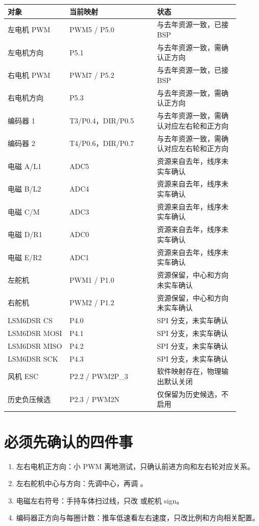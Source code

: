 \documentclass[UTF8,zihao=-4]{ctexart}
\begin{document}
\begin{longtable}{L{0.24\linewidth}L{0.34\linewidth}L{0.32\linewidth}}
\toprule
对象 & 当前映射 & 状态 \\
\midrule
左电机 PWM & PWM5 / P5.0 & 与去年资源一致，已接 BSP \\
左电机方向 & P5.1 & 与去年资源一致，需确认正方向 \\
右电机 PWM & PWM7 / P5.2 & 与去年资源一致，已接 BSP \\
右电机方向 & P5.3 & 与去年资源一致，需确认正方向 \\
编码器 1 & T3/P0.4，DIR/P0.5 & 与去年资源一致，需确认对应左右轮和正方向 \\
编码器 2 & T4/P0.6，DIR/P0.7 & 与去年资源一致，需确认对应左右轮和正方向 \\
电磁 A/L1 & ADC5 & 资源来自去年，线序未实车确认 \\
电磁 B/L2 & ADC4 & 资源来自去年，线序未实车确认 \\
电磁 C/M & ADC3 & 资源来自去年，线序未实车确认 \\
电磁 D/R1 & ADC0 & 资源来自去年，线序未实车确认 \\
电磁 E/R2 & ADC1 & 资源来自去年，线序未实车确认 \\
左舵机 & PWM1 / P1.0 & 资源保留，中心和方向未实车确认 \\
右舵机 & PWM2 / P1.2 & 资源保留，中心和方向未实车确认 \\
LSM6DSR CS & P4.0 & SPI 分支，未实车确认 \\
LSM6DSR MOSI & P4.1 & SPI 分支，未实车确认 \\
LSM6DSR MISO & P4.2 & SPI 分支，未实车确认 \\
LSM6DSR SCK & P4.3 & SPI 分支，未实车确认 \\
风机 ESC & P2.2 / PWM2P\_3 & 软件映射存在，物理输出默认关闭 \\
历史负压候选 & P2.3 / PWM2N & 仅保留为历史候选，不启用 \\
\bottomrule
\end{longtable}

\section*{必须先确认的四件事}

\begin{enumerate}
  \item 左右电机正方向：小 PWM 离地测试，只确认前进方向和左右轮对应关系。
  \item 左右舵机中心与方向：先调中心，再调 。
  \item 电磁左右符号：手持车体扫过线，只改  或舵机 sign。
  \item 编码器正方向与每圈计数：推车低速看左右速度，只改比例和方向相关配置。
\end{enumerate}
\end{document}
